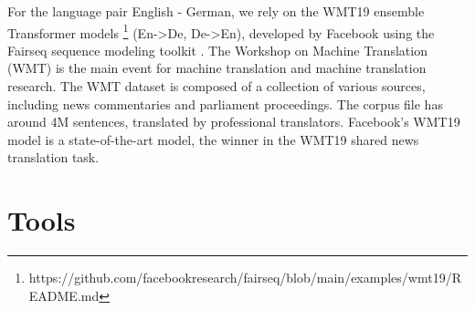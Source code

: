 For the language pair English - German, we rely on the WMT19 ensemble Transformer models \footnote{https://github.com/facebookresearch/fairseq/blob/main/examples/wmt19/README.md} (En->De, De->En), developed by Facebook \parencite{WMT19} using the Fairseq sequence modeling
toolkit \parencite{fairseq}. The Workshop on Machine Translation (WMT) is the main event for machine translation and machine translation research. The WMT dataset is composed of a collection of various sources, including news commentaries and parliament proceedings. The corpus file has around 4M sentences, translated by professional translators. Facebook's WMT19 model is a state-of-the-art model, the winner in the WMT19 shared news translation task.









\section{Tools}
\label{sec:Experiments:Tools}

